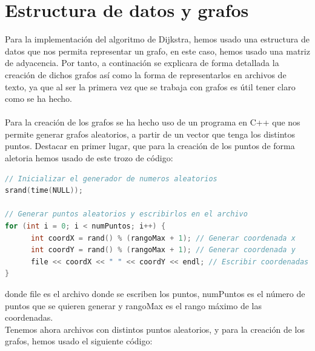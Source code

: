 \documentclass[11pt,openany]{book}
\begin{document}
\section{Estructura de datos y grafos}
Para la implementación del algoritmo de Dijkstra, hemos usado una estructura de datos que nos permita representar un grafo, en este caso,
hemos usado una matriz de adyacencia. Por tanto, a continación se explicara de forma detallada la creación de dichos grafos así como la forma de 
representarlos en archivos de texto, ya que al ser la primera vez que se trabaja con grafos es útil tener
claro como se ha hecho. \\ \\
Para la creación de los grafos se ha hecho uso de un programa en C++ que nos permite generar grafos aleatorios, a partir
de un vector que tenga los distintos puntos. Destacar en primer lugar, que para la creación de los puntos de forma aletoria hemos usado 
de este trozo de código:
\begin{lstlisting}[language=C++]
// Inicializar el generador de numeros aleatorios
srand(time(NULL));

// Generar puntos aleatorios y escribirlos en el archivo
for (int i = 0; i < numPuntos; i++) {
      int coordX = rand() % (rangoMax + 1); // Generar coordenada x
      int coordY = rand() % (rangoMax + 1); // Generar coordenada y
      file << coordX << " " << coordY << endl; // Escribir coordenadas al archivo
}
\end{lstlisting}
donde file es el archivo donde se escriben los puntos, numPuntos es el número de puntos que se quieren generar y rangoMax es el rango
máximo de las coordenadas. \\
Tenemos ahora archivos con distintos puntos aleatorios, y para la creación de los grafos, hemos usado el siguiente código:
\end{document}
